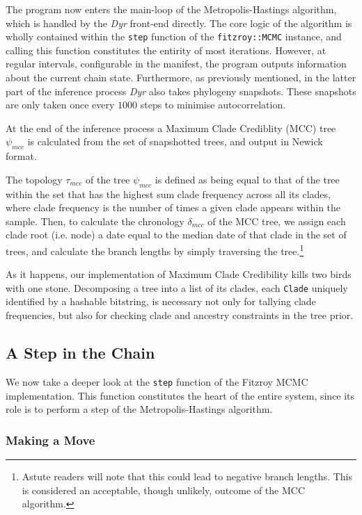 \documentclass[10pt,journal,compsoc]{IEEEtran}
\begin{document}
The program now enters the main-loop of the Metropolis-Hastings algorithm, which is handled by the  \textit{Dyr} front-end directly. The core logic of the algorithm is wholly contained within the \texttt{step} function of the \texttt{fitzroy::MCMC} instance, and calling this function constitutes the entirity of most iterations. However, at regular intervals, configurable in the manifest, the program outputs information about the current chain state. Furthermore, as previously mentioned, in the latter part of the inference process \textit{Dyr} also takes phylogeny snapshots. These snapshots are only taken once every $1000$ steps to minimise autocorrelation.

At the end of the inference process a Maximum Clade Crediblity (MCC) tree $\psi_{mcc}$ is calculated from the set of snapshotted trees, and output in Newick format.

The topology $\tau_{mcc}$ of the tree $\psi_{mcc}$ is defined as being equal to that of the tree within the set that has the highest sum clade frequency across all its clades, where clade frequency is the number of times a given clade appears within the sample. Then, to calculate the chronology $\delta_{mcc}$ of the MCC tree, we assign each clade root (i.e. node) a date equal to the median date of that clade in the set of trees, and calculate the branch lengths by simply traversing the tree.\footnote{Astute readers will note that this could lead to negative branch lengths. This is considered an acceptable, though unlikely, outcome of the MCC algorithm.}

As it happens, our implementation of Maximum Clade Credibility kills two birds with one stone. Decomposing a tree into a list of its clades, each \texttt{Clade} uniquely identified by a hashable bitstring, is necessary not only for tallying clade frequencies, but also for checking clade and ancestry constraints in the tree prior.

\subsection{A Step in the Chain}

We now take a deeper look at the \texttt{step} function of the Fitzroy MCMC implementation. This function constitutes the heart of the entire system, since its role is to perform a step of the Metropolis-Hastings algorithm.

\subsubsection{Making a Move}
\end{document}
